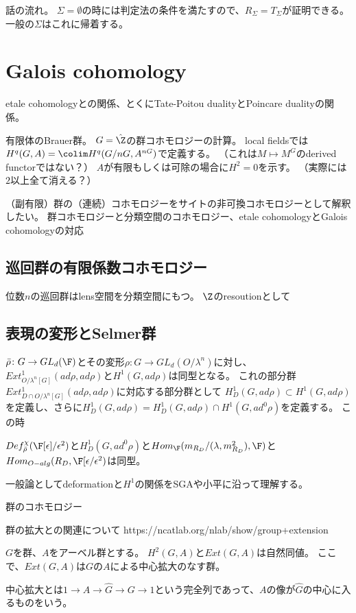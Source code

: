 \documentclass{jsarticle}
\begin{document}
話の流れ。
$\Sigma=\emptyset$の時には判定法の条件を満たすので、$R_\Sigma=T_\Sigma$が証明できる。
一般の$\Sigma$はこれに帰着する。
\section{Galois cohomology}
etale cohomologyとの関係、とくにTate-Poitou dualityとPoincare dualityの関係。

有限体のBrauer群。
$G=\hat{\Z}$の群コホモロジーの計算。
local fieldsでは$H^q(G,A)=\colim H^q(G/nG,A^{nG})$で定義する。
（これは$M\mapsto M^G$のderived functorではない？）
$A$が有限もしくは可除の場合に$H^2=0$を示す。
（実際には$2$以上全て消える？）

（副有限）群の（連続）コホモロジーをサイトの非可換コホモロジーとして解釈したい。
群コホモロジーと分類空間のコホモロジー、etale cohomologyとGalois cohomologyの対応

\subsection{巡回群の有限係数コホモロジー}
位数$n$の巡回群はlens空間を分類空間にもつ。
$\Z$のresoutionとして

\subsection{表現の変形とSelmer群}
$\bar{\rho}\colon G\to GL_d(\F)$とその変形$\rho\colon G\to GL_d(O/\lambda^n)$に対し、
$Ext^1_{O/\lambda^n[G]}(ad\rho,ad\rho)$と$H^1(G,ad\rho)$は同型となる。
これの部分群$Ext^1_{D\cap O/\lambda^n[G]}(ad\rho,ad\rho)$に対応する部分群として
$H^1_D(G,ad\rho)\subset H^1(G,ad\rho)$を定義し、さらに$H^1_D(G,ad\rho)=H^1_D(G,ad\rho)\cap H^1(G,ad^0\rho)$を定義する。
この時
\begin{prob}
$Def^\chi_{\bar{\rho}}(\F[\epsilon]/\epsilon^2)$と$H^1_D(G,ad^0\rho)$と$Hom_{\F}(m_{R_D}/(\lambda,m^2_{R_D}),\F)$と
$Hom_{O-alg}(R_D,\F[\epsilon/\epsilon^2)$は同型。
\end{prob}

一般論としてdeformationと$H^1$の関係をSGAや小平に沿って理解する。


群のコホモロジー

群の拡大との関連について
https://ncatlab.org/nlab/show/group+extension

$G$を群、$A$をアーベル群とする。
$H^2(G,A)$と$Ext(G,A)$は自然同値。
ここで、$Ext(G,A)$は$G$の$A$による中心拡大のなす群。

中心拡大とは$1 \to A \to \hat{G} \to G \to 1$という完全列であって、$A$の像が$\hat{G}$の中心に入るものをいう。
\end{document}
